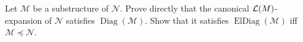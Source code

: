 \begin{exercise}
\label{ex:maps-elementarity-01}
\label{ex:diagram-test}
Let \(\mathcal M\) be a substructure of \(\mathcal N\).  Prove directly that
the canonical \(\mathcal{L}(M)\)-expansion of \(\mathcal N\) satisfies
\(\operatorname{Diag}(\mathcal M)\).  Show that it satisfies
\(\operatorname{ElDiag}(\mathcal M)\) iff
\(\mathcal M\preccurlyeq\mathcal N\).
\end{exercise}

